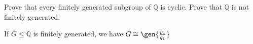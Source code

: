 \documentclass[parskip=full, draft]{scrartcl}
\begin{document}
\listoftodos
\begin{prob}{9}
    Prove that every finitely generated subgroup of \(\mathbb{Q}\) is cyclic. Prove that \(\mathbb{Q}\) is not finitely generated.
\end{prob}
\begin{sol}
    If \(G \leq \mathbb{Q}\) is finitely generated, we have \(G \cong \gen{\frac{p_1}{q_1}}\)
\end{sol}
\end{document}
